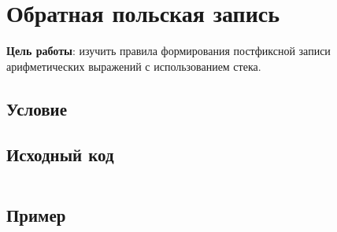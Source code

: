
\usepackage{minted}





\section{Обратная польская запись}

\textbf{Цель работы}: изучить правила формирования постфиксной записи арифметических выражений с использованием стека.

\subsection{Условие}



\subsection{Исходный код}
\inputminted[fontsize=\footnotesize]{c}{../task.c}

\subsection{Пример}
\inputminted[fontsize=\footnotesize]{text}{examples/example.txt}


